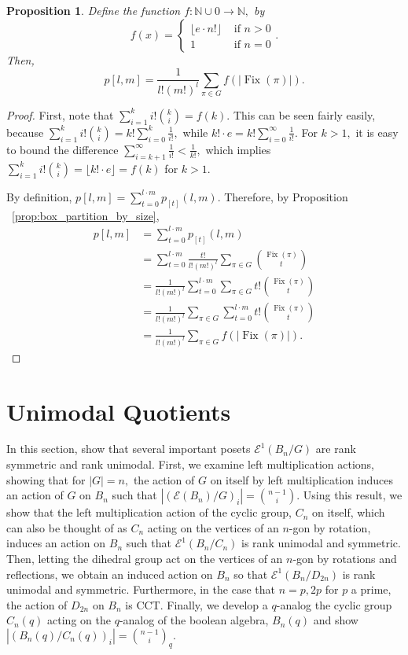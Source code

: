 \documentclass[10 pt]{amsart}
\theoremstyle{plain}
\newtheorem{prop}[thm]{Proposition}
\theoremstyle{definition}
\theoremstyle{remark}
\numberwithin{equation}{section}
\newcommand\BN{{\mathbb N}}
\def\Fix{\operatorname{Fix}}
\begin{document}
\begin{prop}
\label{prop:all_box_partitions}
Define the function $f:\BN \cup 0 \rightarrow \BN,$ by $$f(x) = \begin{cases} \lfloor e\cdot n!\rfloor &\text{ if } n > 0 \\ 1 &\text{ if } n = 0\end{cases}.$$
Then, $$p[l,m] = \frac 1 {l!(m!)^l}\sum_{\pi \in G} f(|\Fix(\pi)|).$$
\end{prop}
\begin{proof}
First, note that $\sum_{i=1}^k i! \binom k i = f(k).$ This can be seen fairly easily, because $\sum_{i=1}^k i! \binom k i = k!\sum_{i=0}^k \frac 1 {i!},$ while $k! \cdot e = k!\sum_{i=0}^\infty \frac 1 {i!}.$ For $k > 1,$ it is easy to bound the difference $\sum_{i=k+1}^\infty \frac 1 {i!} < \frac 1 {k!},$ which implies   $\sum_{i=1}^k i! \binom k i  = \lfloor k! \cdot e \rfloor = f(k)$ for $k > 1.$

By definition, $p[l,m] = \sum_{t = 0}^{l\cdot m} p_{[t]}(l,m)$. Therefore, by Proposition ~\ref{prop:box_partition_by_size},
\begin{align*}
p[l,m] &= \sum_{t = 0}^{l\cdot m} p_{[t]}(l,m)\\
&=\sum_{t = 0}^{l\cdot m}\frac {t!}{l!(m!)^l}\sum_{\pi \in G} \binom {\Fix(\pi)} t\\
&= \frac {1}{l!(m!)^l}\sum_{t = 0}^{l\cdot m}\sum_{\pi \in G} t!\binom {\Fix(\pi)} t\\
&=  \frac {1}{l!(m!)^l}\sum_{\pi \in G}\sum_{t = 0}^{l\cdot m} t!\binom {\Fix(\pi)} t\\
&= \frac {1}{l!(m!)^l}\sum_{\pi \in G} f(|\Fix(\pi)|).
\end{align*}
\end{proof}






\section{Unimodal Quotients}

In this section, show that several important posets $\mathcal E^1(B_n/G)$ are rank symmetric and rank unimodal. First, we examine left multiplication actions, showing that for $|G| = n,$ the action of $G$ on itself by left multiplication induces an action of $G$ on $B_n$ such that $|(\mathcal E(B_n)/G)_i| = \binom {n-1} i.$ Using this result, we show that the left multiplication action of the cyclic group, $C_n$ on itself, which can also be thought of as $C_n$ acting on the vertices of an $n$-gon by rotation, induces an action on $B_n$ such that $\mathcal E^1(B_n/C_n)$ is rank unimodal and symmetric. Then, letting the dihedral group act on the vertices of an $n$-gon by rotations and reflections, we obtain an induced action on $B_n$ so that $\mathcal E^1(B_n/D_{2n})$ is rank unimodal and symmetric. Furthermore, in the case that $n = p,2p$ for $p$ a prime, the action of $D_{2n}$ on $B_n$ is CCT. Finally, we develop a $q$-analog the cyclic group $C_n(q)$ acting on the $q$-analog of the boolean algebra, $B_n(q)$ and show $|(B_n(q)/C_n(q))_i| = \binom {n-1} i _q.$
\end{document}
